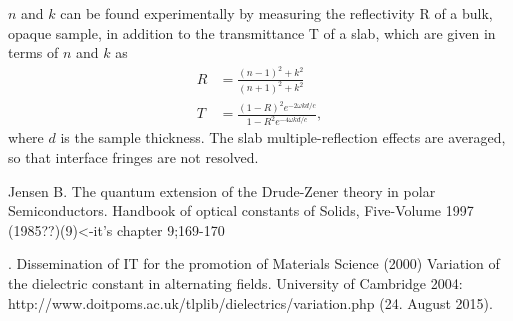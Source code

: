 $n$ and $k$ can be found experimentally by measuring the reflectivity R of a bulk, opaque sample,
in addition to the transmittance T of a slab, which are given in terms of $n$ and $k$ as
\begin{align}
   R &= \frac{(n-1)^2 + k^2}{(n+1)^2 + k^2} \\
   T &= \frac{ (1-R)^2 e^{-2\omega k d / c} }{ 1-R^2 e^{-4\omega k d / c} },
\end{align}
where $d$ is the sample thickness. The slab multiple-reflection effects are averaged,
so that interface fringes are not resolved.
%
\begin{thebibliography}{9}

       Jensen B.
       The quantum extension of the Drude-Zener theory in polar Semiconductors.
       Handbook of optical constants of Solids, Five-Volume 1997 (1985??)(9)<-it's chapter 9;169-170

      .
         Dissemination of IT for the promotion of Materials Science (2000)
         Variation of the dielectric constant in alternating fields.
         University of Cambridge 2004:
         http://www.doitpoms.ac.uk/tlplib/dielectrics/variation.php
         (24. August 2015).
\end{thebibliography}
